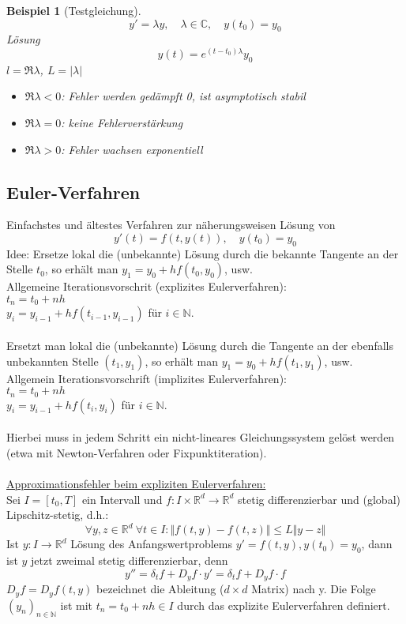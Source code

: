 \documentclass[12pt]{article}
\theoremstyle{break}
\newtheorem{example}[theorem]{Beispiel}
\begin{document}
\begin{example}[Testgleichung]\leavevmode
$$ y' = \lambda y, \quad \lambda \in \mathbb{C}, \quad y(t_0) = y_0$$
Lösung
$$ y(t) = e^{(t-t_0)\lambda}y_0$$
$l = \Re \lambda$, $L = \vert \lambda \vert$
\begin{itemize}
  \item $\Re \lambda < 0$: Fehler werden gedämpft 0, ist asymptotisch stabil
  \item $\Re \lambda = 0$: keine Fehlerverstärkung
  \item $\Re \lambda > 0$: Fehler wachsen exponentiell
\end{itemize}
\end{example}

\subsection{Euler-Verfahren}
Einfachstes und ältestes Verfahren zur näherungsweisen Lösung von
$$y'(t) = f(t, y(t)), \quad y(t_0) = y_0$$
Idee: Ersetze lokal die (unbekannte) Lösung durch die bekannte Tangente an der Stelle $t_0$, so erhält man $y_1 = y_0 + hf(t_0,y_0)$, usw. \\
Allgemeine Iterationsvorschrit (explizites Eulerverfahren):\\
$t_n = t_0 + nh$ \\
$y_i = y_{i-1} + hf(t_{i-1}, y_{i-1})$ für $i\in \mathbb{N}$.\\
\\
Ersetzt man lokal die (unbekannte) Lösung durch die Tangente an der ebenfalls unbekannten Stelle $(t_1, y_1)$, so erhält man $y_1 = y_0 + hf(t_1, y_1)$, usw.\\
Allgemein Iterationsvorschrift (implizites Eulerverfahren):\\
$t_n = t_0 + nh$ \\
$y_i = y_{i-1} + hf(t_{i}, y_{i})$ für $i\in \mathbb{N}$.\\
\\
Hierbei muss in jedem Schritt ein nicht-lineares Gleichungssystem gelöst werden (etwa mit Newton-Verfahren oder Fixpunktiteration).\\
\\
\underline{Approximationsfehler beim expliziten Eulerverfahren:}\\
Sei $I = [t_0, T]$ ein Intervall und $f\colon I \times \mathbb{R}^d \rightarrow \mathbb{R}^d$ stetig differenzierbar und (global) Lipschitz-stetig, d.h.:
$$\forall y, z \in \mathbb{R}^d \medspace \forall t \in I\colon
\Vert f(t, y) - f(t, z) \Vert \leq L \Vert y-z \Vert$$
Ist $y\colon I \rightarrow \mathbb{R}^d$ Lösung des Anfangswertproblems $y' = f(t, y), y(t_0) = y_0$, dann ist $y$ jetzt zweimal stetig differenzierbar, denn
$$y'' = \delta_tf + D_yf \cdot y' = \delta_tf + D_yf \cdot f$$
$D_yf = D_yf(t, y)$ bezeichnet die Ableitung ($d \times d$ Matrix) nach y. Die Folge $(y_n)_{n \in \mathbb{N}}$ ist mit $t_n = t_0 + nh \in I$ durch das explizite Eulerverfahren definiert.
\end{document}
